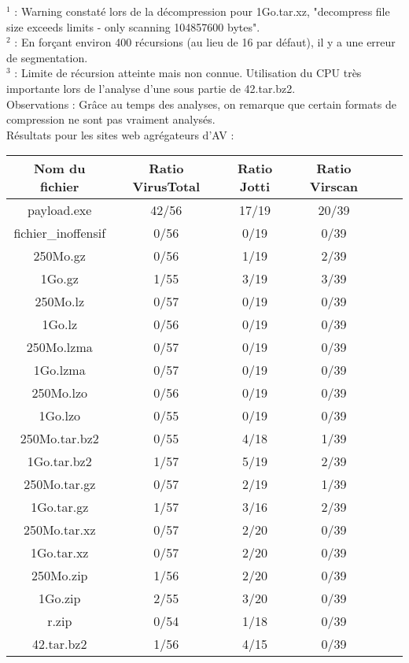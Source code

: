 \documentclass[smallextended]{svjour3}       %
\begin{document}
$ $\\
$^1$ : Warning constaté lors de la décompression pour 1Go.tar.xz, "decompress file size exceeds limits - only scanning 104857600 bytes".\\
$^2$ : En forçant environ 400 récursions (au lieu de 16 par défaut), il y a une erreur de segmentation.\\
$^3$ : Limite de récursion atteinte mais non connue. Utilisation du CPU très importante lors de l'analyse d'une sous partie de 42.tar.bz2.\\
Observations : Grâce au temps des analyses, on remarque que certain formats de compression ne sont pas vraiment analysés.
$ $\\
Résultats pour les sites web agrégateurs d'AV :\\
\begin{tabular}{|*{6}{c|}}
    \hline
\textbf{Nom du fichier} & \textbf{Ratio VirusTotal} & \textbf{Ratio Jotti} & \textbf{Ratio Virscan} \\
	\hline
payload.exe & 42/56 & 17/19 & 20/39\\
	\hline
fichier\_inoffensif & 0/56 & 0/19  & 0/39 \\
	\hline
	\hline
250Mo.gz & 0/56 & 1/19 & 2/39 \\
	\hline
1Go.gz &  1/55  & 3/19 & 3/39\\
    \hline
    \hline
250Mo.lz & 0/57 & 0/19 & 0/39\\
	\hline
1Go.lz & 0/56 & 0/19 & 0/39\\
    \hline
    \hline
250Mo.lzma & 0/57 & 0/19 & 0/39\\
	\hline
1Go.lzma & 0/57 & 0/19 & 0/39\\
    \hline
    \hline
250Mo.lzo & 0/56 & 0/19 & 0/39\\
	\hline
1Go.lzo & 0/55 & 0/19 & 0/39\\
    \hline
    \hline
250Mo.tar.bz2 & 0/55 & 4/18 & 1/39\\
	\hline
1Go.tar.bz2 & 1/57 & 5/19 & 2/39\\
    \hline
    \hline
250Mo.tar.gz & 0/57 & 2/19 & 1/39\\
	\hline
1Go.tar.gz & 1/57 & 3/16 & 2/39\\
    \hline
    \hline
250Mo.tar.xz & 0/57 & 2/20 & 0/39\\
	\hline
1Go.tar.xz & 0/57 & 2/20 & 0/39\\
    \hline
    \hline
250Mo.zip & 1/56 & 2/20 & 0/39\\
	\hline
1Go.zip & 2/55 & 3/20 & 0/39\\
    \hline
    \hline
r.zip & 0/54 & 1/18 & 0/39\\
	\hline
42.tar.bz2 & 1/56 & 4/15 & 0/39\\
	\hline
\end{tabular}
\end{document}

